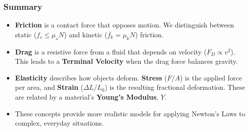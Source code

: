 \documentclass{beamer}
\begin{document}
\begin{frame}
\frametitle{Summary}
\begin{itemize}
    \item \textbf{Friction} is a contact force that opposes motion. We distinguish between static ($f_s \le \mu_s N$) and kinetic ($f_k = \mu_k N$) friction. \pause
    \item \textbf{Drag} is a resistive force from a fluid that depends on velocity ($F_D \propto v^2$). This leads to a \textbf{Terminal Velocity} when the drag force balances gravity. \pause
    \item \textbf{Elasticity} describes how objects deform. \textbf{Stress} ($F/A$) is the applied force per area, and \textbf{Strain} ($\Delta L/L_0$) is the resulting fractional deformation. These are related by a material's \textbf{Young's Modulus}, $Y$. \pause
    \item These concepts provide more realistic models for applying Newton's Laws to complex, everyday situations.
\end{itemize}
\end{frame}
\end{document}

